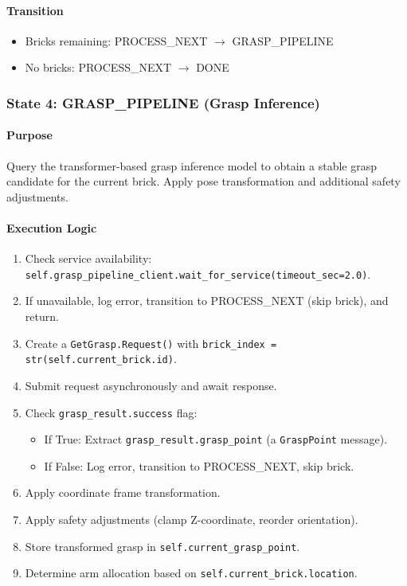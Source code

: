 \paragraph{Transition}

\begin{itemize}
    \item Bricks remaining: PROCESS\_NEXT $\rightarrow$ GRASP\_PIPELINE
    \item No bricks: PROCESS\_NEXT $\rightarrow$ DONE
\end{itemize}

\subsubsection{State 4: GRASP\_PIPELINE (Grasp Inference)}
\label{state:grasppipeline}

\paragraph{Purpose}

Query the transformer-based grasp inference model to obtain a stable grasp candidate for the current brick. Apply pose transformation and additional safety adjustments.

\paragraph{Execution Logic}

\begin{enumerate}
    \item Check service availability: \texttt{self.grasp\_pipeline\_client.wait\_for\_service(timeout\_sec=2.0)}.
    \item If unavailable, log error, transition to PROCESS\_NEXT (skip brick), and return.
    \item Create a \texttt{GetGrasp.Request()} with \texttt{brick\_index = str(self.current\_brick.id)}.
    \item Submit request asynchronously and await response.
    \item Check \texttt{grasp\_result.success} flag:
    \begin{itemize}
        \item If True: Extract \texttt{grasp\_result.grasp\_point} (a \texttt{GraspPoint} message).
        \item If False: Log error, transition to PROCESS\_NEXT, skip brick.
    \end{itemize}
    \item Apply coordinate frame transformation.
    \item Apply safety adjustments (clamp Z-coordinate, reorder orientation).
    \item Store transformed grasp in \texttt{self.current\_grasp\_point}.
    \item Determine arm allocation based on \texttt{self.current\_brick.location}.
\end{enumerate}


